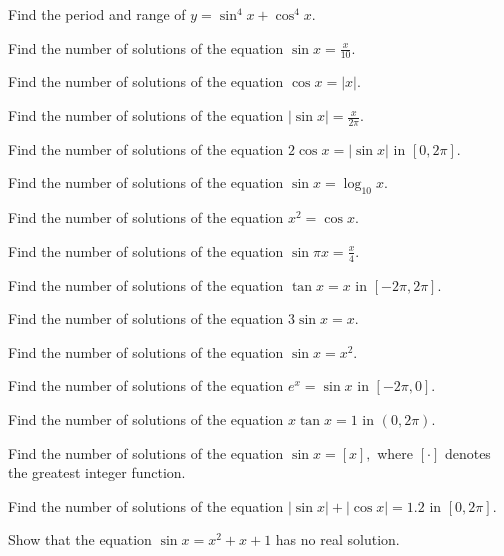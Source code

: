 \item Find the period and range of $y = \sin^4x + \cos^4x.$

\item Find the number of solutions of the equation $\sin x = \frac{x}{10}.$

\item Find the number of solutions of the equation $\cos x = |x|.$

\item Find the number of solutions of the equation $|\sin x| = \frac{x}{2\pi}.$

\item Find the number of solutions of the equation $2\cos x = |\sin x|$ in $[0, 2\pi].$

\item Find the number of solutions of the equation $\sin x = \log_{10}x.$

\item Find the number of solutions of the equation $x^2 = \cos x.$

\item Find the number of solutions of the equation $\sin \pi x = \frac{x}{4}.$

\item Find the number of solutions of the equation $\tan x = x$ in $[-2\pi, 2\pi].$

\item Find the number of solutions of the equation $3\sin x = x.$

\item Find the number of solutions of the equation $\sin x = x^2.$

\item Find the number of solutions of the equation $e^x = \sin x$ in $[-2\pi, 0].$

\item Find the number of solutions of the equation $x\tan x = 1$ in $(0, 2\pi).$

\item Find the number of solutions of the equation $\sin x = [x],$ where $[\cdot]$ denotes the greatest integer
    function.

\item Find the number of solutions of the equation $|\sin x| + |\cos x| = 1.2$ in $[0, 2\pi].$

\item Show that the equation $\sin x = x^2 + x + 1$ has no real solution.

